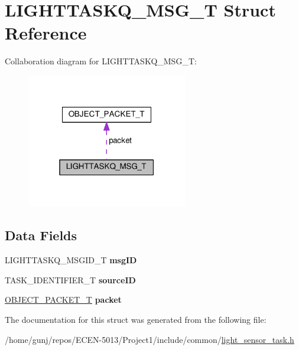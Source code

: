 \hypertarget{structLIGHTTASKQ__MSG__T}{}\section{L\+I\+G\+H\+T\+T\+A\+S\+K\+Q\+\_\+\+M\+S\+G\+\_\+T Struct Reference}
\label{structLIGHTTASKQ__MSG__T}


Collaboration diagram for L\+I\+G\+H\+T\+T\+A\+S\+K\+Q\+\_\+\+M\+S\+G\+\_\+T\+:\nopagebreak
\begin{figure}[H]
\begin{center}
\leavevmode
\includegraphics[width=199pt]{structLIGHTTASKQ__MSG__T__coll__graph}
\end{center}
\end{figure}
\subsection*{Data Fields}
\begin{DoxyCompactItemize}
\item 
L\+I\+G\+H\+T\+T\+A\+S\+K\+Q\+\_\+\+M\+S\+G\+I\+D\+\_\+T {\bfseries msg\+ID}\hypertarget{structLIGHTTASKQ__MSG__T_a6d0d6fad55adda1f3922616bc34a7902}{}\label{structLIGHTTASKQ__MSG__T_a6d0d6fad55adda1f3922616bc34a7902}

\item 
T\+A\+S\+K\+\_\+\+I\+D\+E\+N\+T\+I\+F\+I\+E\+R\+\_\+T {\bfseries source\+ID}\hypertarget{structLIGHTTASKQ__MSG__T_a73522367ea6c6c3c9a3e98a817d4c50f}{}\label{structLIGHTTASKQ__MSG__T_a73522367ea6c6c3c9a3e98a817d4c50f}

\item 
\hyperlink{structOBJECT__PACKET__T}{O\+B\+J\+E\+C\+T\+\_\+\+P\+A\+C\+K\+E\+T\+\_\+T} {\bfseries packet}\hypertarget{structLIGHTTASKQ__MSG__T_a9ab5b74f39c56fe79cabf08e00bcd339}{}\label{structLIGHTTASKQ__MSG__T_a9ab5b74f39c56fe79cabf08e00bcd339}

\end{DoxyCompactItemize}


The documentation for this struct was generated from the following file\+:\begin{DoxyCompactItemize}
\item 
/home/gunj/repos/\+E\+C\+E\+N-\/5013/\+Project1/include/common/\hyperlink{light__sensor__task_8h}{light\+\_\+sensor\+\_\+task.\+h}\end{DoxyCompactItemize}
